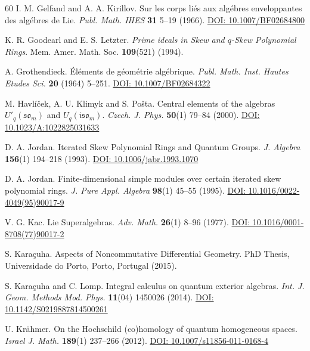 \documentclass{amsart}
\theoremstyle{definition}
\theoremstyle{remark}
\numberwithin{equation}{section}
\begin{document}
\begin{thebibliography}{60}
 I. M. Gelfand and A. A. Kirillov. Sur les corps li\'es aux alg\'ebres enveloppantes des alg\'ebres de Lie. {\em Publ. Math. IHES} {\bf 31} 5--19 (1966). \href{https://doi.org/10.1007/BF02684800}{DOI: 10.1007/BF02684800}

 K. R. Goodearl and E. S. Letzter. {\em Prime ideals in Skew and $q$-Skew Polynomial Rings}. Mem. Amer. Math. Soc. {\bf 109}(521) (1994).

 A. Grothendieck. \'El\'ements de g\'eom\'etrie alg\'ebrique. {\em Publ. Math. Inst. Hautes Etudes Sci.} {\bf 20} (1964) 5--251. \href{https://www.numdam.org/item/PMIHES_1965__24__5_0/}{DOI: 10.1007/BF02684322 }

 M. Havl\'i\v{c}ek, A. U. Klimyk and S. Po\v{s}ta. Central elements of the algebras ${U}'_q(\mathfrak{so}_m)$ and ${U}_q(\mathfrak{iso}_m)$. {\em Czech. J. Phys.} {\bf 50}(1) 79--84 (2000). \href{https://doi.org/10.1023/A:1022825031633}{DOI: 10.1023/A:1022825031633}

 D. A. Jordan. Iterated Skew Polynomial Rings and Quantum Groups. {\em J. Algebra} {\bf 156}(1) 194--218 (1993). \href{https://doi.org/10.1006/jabr.1993.1070}{DOI: 10.1006/jabr.1993.1070}

 D. A. Jordan. Finite-dimensional simple modules over certain iterated skew polynomial rings. {\em J. Pure Appl. Algebra} {\bf 98}(1) 45--55 (1995). \href{https://doi.org/10.1016/0022-4049(95)90017-9}{DOI: 10.1016/0022-4049(95)90017-9}

 V. G. Kac. Lie Superalgebras. {\em Adv. Math.} {\bf 26}(1) 8--96 (1977). \href{https://doi.org/10.1016/0001-8708(77)90017-2}{DOI: 10.1016/0001-8708(77)90017-2}

 S. Kara\c cuha. Aspects of Noncommutative Differential Geometry. PhD Thesis, Universidade do Porto, Porto, Portugal (2015).

S. Kara\c cuha and C. Lomp. Integral calculus on quantum exterior algebras. {\em Int. J. Geom. Methods Mod. Phys.} {\bf 11}(04) 1450026 (2014). \href{https://doi.org/10.1142/S0219887814500261}{DOI: 10.1142/S0219887814500261}

 U. Kr\"ahmer. On the Hochschild (co)homology of quantum homogeneous spaces. {\em Israel J. Math.} {\bf 189}(1) 237--266 (2012). \href{https://doi.org/10.1007/s11856-011-0168-4}{DOI: 10.1007/s11856-011-0168-4}


\end{thebibliography}
\end{document}
